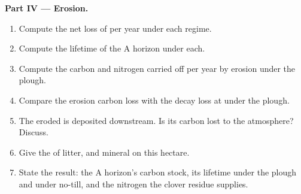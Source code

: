 \begin{problem}
\medskip
\noindent\textbf{Part IV --- Erosion.}
\begin{enumerate}[resume]
  \item Compute the net loss of  per year under each regime.
  \item Compute the lifetime of the A horizon under each.
  \item Compute the carbon and nitrogen carried off per year by
        erosion under the plough.
  \item Compare the erosion carbon loss with the  decay loss at
         under the plough.
  \item The eroded  is deposited downstream. Is its carbon
        lost to the atmosphere? Discuss.
  \item Give the  of litter,  and mineral 
        on this hectare.
  \item State the result: the A horizon's carbon stock, its
        lifetime under the plough and under no-till, and the
        nitrogen the clover residue supplies.
\end{enumerate}
\end{problem}
